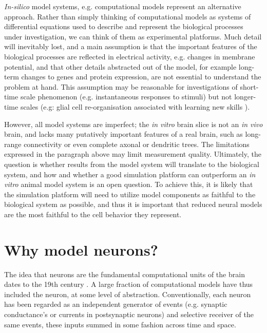\emph{In-silico} model systems, e.g. computational models represent an alternative approach.
Rather than simply thinking of computational models as systems of differential equations used to describe and represent the biological processes under investigation, we can think of them as experimental platforms.
Much detail will inevitably lost, and a main assumption is that the important features of the biological processes are reflected in electrical activity, e.g. changes in membrane potential, and that other details abstracted out of the model, for example long-term changes to genes and protein expression, are not essential to understand the problem at hand.
This assumption may be reasonable for investigations of short-time scale phenomenon (e.g. instantaneous responses to stimuli) but not longer-time scales (e.g: glial cell re-organisation associated with learning new skills \citep{draganski2008training}).

However, all model systems are imperfect; the \emph{in vitro} brain slice is not an \emph{in vivo} brain, and lacks many putatively important features of a real brain, such as long-range connectivity or even complete axonal or dendritic trees.
The limitations expressed in the paragraph above may limit measurement quality.
Ultimately, the question is whether results from the model system will translate to the biological system, and how and whether a good simulation platform can outperform an \emph{in vitro} animal model system is an open question.
To achieve this, it is likely that the simulation platform will need to utilize model components as faithful to the biological system as possible, and thus it is important that reduced neural models are the most faithful to the cell behavior they represent. 

\section{Why model neurons?}
The idea that neurons are the fundamental computational units of the brain dates to the 19th century \citep{shepherd2015foundations,jones1999golgi}.
A large fraction of computational models have thus included the neuron, at some level of abstraction.  
Conventionally, each neuron has been regarded as an independent generator of events (e.g. synaptic conductance's or currents in postsynaptic neurons) and selective receiver of the same events, these inputs summed in some fashion across time and space. 


